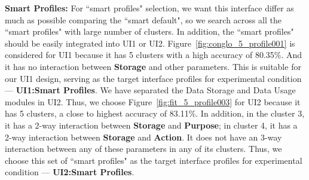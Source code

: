 \textbf{Smart Profiles:} For ``smart profiles" selection, we want this interface differ as much as possible comparing the ``smart default", so we search across all the ``smart profiles" with large number of clusters. In addition, the ``smart profiles" should be easily integrated into UI1 or UI2. Figure~\ref{fig:conglo_5_profile001} is considered for UI1 because it has 5 clusters with a high accuracy of 80.35\%. And it has no interaction between \textbf{Storage} and other parameters. This is suitable for our UI1 design, serving as the target interface profiles for experimental condition --- \textbf{UI1:Smart Profiles}. We have separated the Data Storage and Data Usage modules in UI2. Thus, we choose Figure~\ref{fig:fit_5_profile003} for UI2 because it has 5 clusters, a close to highest accuracy of 83.11\%. In addition, in the cluster 3, it has a 2-way interaction between \textbf{Storage} and \textbf{Purpose}; in cluster 4, it has a 2-way interaction between \textbf{Storage} and \textbf{Action}. It does not have an 3-way interaction between any of these parameters in any of its clusters. Thus, we choose this set of ``smart profiles" as the target interface profiles for experimental condition --- \textbf{UI2:Smart Profiles}.



